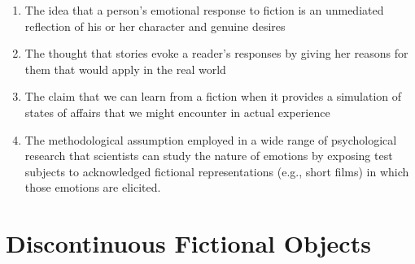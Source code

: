 \documentclass[phdthesis,12pt,final]{wuthesis}
\theoremstyle{definition}
\theoremstyle{definition}
\theoremstyle{definition}
\theoremstyle{definition}
\theoremstyle{remark}
\begin{document}
\begin{enumerate}
\def\labelenumi{\arabic{enumi}.}
\tightlist
\item
  The idea that a person's emotional response to fiction is an unmediated reflection of his or her character and genuine desires
\item
  The thought that stories evoke a reader's responses by giving her reasons for them that would apply in the real world
\item
  The claim that we can learn from a fiction when it provides a simulation of states of affairs that we might encounter in actual experience
\item
  The methodological assumption employed in a wide range of psychological research that scientists can study the nature of emotions by exposing test subjects to acknowledged fictional representations (e.g., short films) in which those emotions are elicited.
\end{enumerate}

\section{Discontinuous Fictional Objects}\label{discontinuous-fictional-objects}
\end{document}
